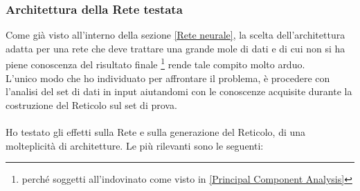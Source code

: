 \subsubsection{Architettura della Rete testata}
\label{Architettura della Rete testata 89}
Come già visto all'interno della sezione \ref{Rete neurale}, la scelta dell'architettura adatta per una rete che deve trattare una grande mole di dati e di cui non si ha piene conoscenza del risultato finale \footnote{perché soggetti all'indovinato come visto in \ref{Principal Component Analysis}} rende tale compito molto arduo.\\
L'unico modo che ho individuato per affrontare il problema, è procedere con l'analisi del set di dati in input aiutandomi con le conoscenze acquisite durante la costruzione del Reticolo sul set di prova.\\\\
\noindent
Ho testato gli effetti sulla Rete e sulla generazione del Reticolo, di una molteplicit\`a di architetture. Le pi\`u rilevanti sono le seguenti:
